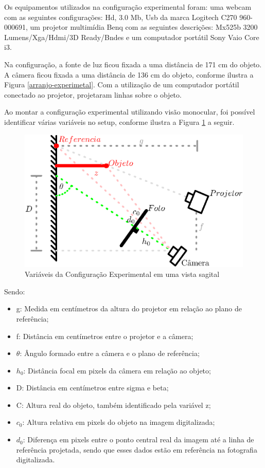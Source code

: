 \documentclass[a4paper, 12pt]{article}
\begin{document}
Os equipamentos utilizados na configuração experimental foram: uma webcam com as seguintes configurações: Hd, 3.0 Mb, Usb da marca Logitech C270 960-000691, um projetor multimídia Benq com as seguintes descrições: Mx525b 3200 Lumens/Xga/Hdmi/3D Ready/Bndes e um computador portátil Sony Vaio Core i3. 

Na configuração, a fonte de luz ficou fixada a uma distância de 171 cm do objeto. A câmera ficou fixada a uma distância de 136 cm do objeto, conforme ilustra a Figura \ref{arranjo-experimetal}.  Com a utilização de um computador portátil conectado ao projetor, projetaram linhas sobre o objeto.

Ao montar a configuração experimental utilizando visão monocular, foi possível identificar várias variáveis no setup, conforme ilustra a Figura \ref{setup com as variaveis} a seguir.

\begin{figure}[h!]
	\centering
		\includegraphics[width=.55\linewidth]{Diagrama1.eps}
	\caption{Variáveis da Configuração Experimental em uma vista sagital}
	\label{setup com as variaveis}
\end{figure}

Sendo:

\begin{itemize}
\item g: Medida em centímetros da altura do projetor em relação ao plano de referência;
\item f:  Distância em centímetros entre o projetor e a câmera;	          
\item $\theta$: Ângulo formado entre a câmera e o plano de referência;
\item $h_0$: Distância focal em pixels da câmera em relação ao objeto;  
\item D:  Distância em centímetros entre sigma e beta;
\item C: Altura real do objeto, também identificado pela variável z;
\item $c_0$: Altura relativa em pixels do objeto na imagem digitalizada;
\item $d_0$: Diferença em pixels entre o ponto central real da imagem até a linha de referência projetada, sendo que esses dados estão em referência na fotografia digitalizada. 
\end{itemize} 
 
\end{document}
